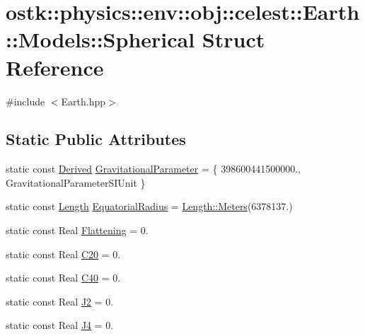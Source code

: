 \hypertarget{structostk_1_1physics_1_1env_1_1obj_1_1celest_1_1_earth_1_1_models_1_1_spherical}{}\section{ostk\+:\+:physics\+:\+:env\+:\+:obj\+:\+:celest\+:\+:Earth\+:\+:Models\+:\+:Spherical Struct Reference}
\label{structostk_1_1physics_1_1env_1_1obj_1_1celest_1_1_earth_1_1_models_1_1_spherical}


{\ttfamily \#include $<$Earth.\+hpp$>$}

\subsection*{Static Public Attributes}
\begin{DoxyCompactItemize}
\item 
static const \hyperlink{classostk_1_1physics_1_1units_1_1_derived}{Derived} \hyperlink{structostk_1_1physics_1_1env_1_1obj_1_1celest_1_1_earth_1_1_models_1_1_spherical_a3831196727363575e80b74048a8bb90b}{Gravitational\+Parameter} = \{ 398600441500000., Gravitational\+Parameter\+S\+I\+Unit \}
\item 
static const \hyperlink{classostk_1_1physics_1_1units_1_1_length}{Length} \hyperlink{structostk_1_1physics_1_1env_1_1obj_1_1celest_1_1_earth_1_1_models_1_1_spherical_a3b96cf45bfaff008ec0f7cc6b4683c14}{Equatorial\+Radius} = \hyperlink{classostk_1_1physics_1_1units_1_1_length_ad227977ce00756791595796a0dd5ddd7}{Length\+::\+Meters}(6378137.)
\item 
static const Real \hyperlink{structostk_1_1physics_1_1env_1_1obj_1_1celest_1_1_earth_1_1_models_1_1_spherical_a87dcafae5a5913efb3dacee2e7461911}{Flattening} = 0.
\item 
static const Real \hyperlink{structostk_1_1physics_1_1env_1_1obj_1_1celest_1_1_earth_1_1_models_1_1_spherical_acce91ef3f994c84d6cebcfa03772f6c3}{C20} = 0.
\item 
static const Real \hyperlink{structostk_1_1physics_1_1env_1_1obj_1_1celest_1_1_earth_1_1_models_1_1_spherical_a4dd38dc85abe2bfe84f1ec010d9f4771}{C40} = 0.
\item 
static const Real \hyperlink{structostk_1_1physics_1_1env_1_1obj_1_1celest_1_1_earth_1_1_models_1_1_spherical_a900841a0d28d72f2fc5cf41903de9941}{J2} = 0.
\item 
static const Real \hyperlink{structostk_1_1physics_1_1env_1_1obj_1_1celest_1_1_earth_1_1_models_1_1_spherical_a02ac9f0787e4753f27fb6b57d6de7401}{J4} = 0.
\end{DoxyCompactItemize}


